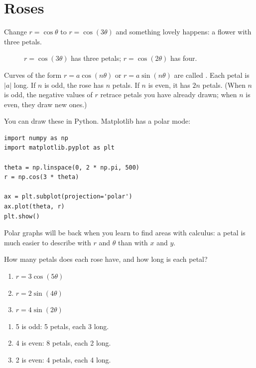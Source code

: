 \section{Roses}

Change $r = \cos{\theta}$ to $r = \cos{(3\theta)}$ and something lovely
happens: a flower with three petals.

\begin{figure}[H]
\centering
{}
\caption{$r = \cos{(3\theta)}$ has three petals; $r = \cos{(2\theta)}$ has four.}
\label{fig:roses}
\end{figure}

Curves of the form $r = a\cos{(n\theta)}$ or $r = a\sin{(n\theta)}$ are
called . Each petal is $|a|$ long. If $n$
is odd, the rose has $n$ petals. If $n$ is even, it has $2n$ petals. (When
$n$ is odd, the negative values of $r$ retrace petals you have already
drawn; when $n$ is even, they draw new ones.)

You can draw these in Python. Matplotlib has a polar mode:

\begin{verbatim}
import numpy as np
import matplotlib.pyplot as plt

theta = np.linspace(0, 2 * np.pi, 500)
r = np.cos(3 * theta)

ax = plt.subplot(projection='polar')
ax.plot(theta, r)
plt.show()
\end{verbatim}

Polar graphs will be back when you learn to find areas with calculus: a
petal is much easier to describe with $r$ and $\theta$ than with $x$ and
$y$.

\begin{Exercise}[title={Petals}, label=polar_roses]
How many petals does each rose have, and how long is each petal?
\begin{enumerate}
\item $r = 3\cos{(5\theta)}$
\item $r = 2\sin{(4\theta)}$
\item $r = 4\sin{(2\theta)}$
\end{enumerate}
\end{Exercise}

\begin{Answer}[ref=polar_roses]
\begin{enumerate}
\item 5 is odd: 5 petals, each 3 long.
\item 4 is even: 8 petals, each 2 long.
\item 2 is even: 4 petals, each 4 long.
\end{enumerate}
\end{Answer}